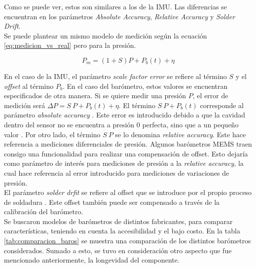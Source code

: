 Como se puede ver, estos son similares a los de la IMU. Las diferencias se encuentran en los parámetros \textit{Absolute Accuracy}, \textit{Relative Accuracy} y \textit{Solder Drift}.\\

Se puede plantear un mismo modelo de medición según la ecuación \ref{eq:medicion_vs_real} pero para la presión.

\begin{equation}
    P_m = (1+S)P + P_b(t) + \eta
    \label{eq:medicion_presion}
\end{equation}

En el caso de la IMU, el parámetro \textit{scale factor error} se refiere al término $S$ y el \textit{offset} al término $P_b$. En el caso del barómetro, estos valores se encuentran especificados de otra manera. Si se quiere medir una presión $P$, el error de medición será $\Delta P = S \ P + P_b(t) + \eta$. El término $S \ P + P_b(t)$ corresponde al parámetro \textit{absolute accuracy} \cite{baro_4}. Este error es introducido debido a que la cavidad dentro del sensor no se encuentra a presión 0 perfecta, sino que a un pequeño valor \cite{baro_1}. Por otro lado, el término $S \ P$ se lo denomina \textit{relative accuracy}. Este hace referencia a mediciones diferenciales de presión. Algunos barómetros MEMS traen consigo una funcionalidad para realizar una compensación de offset. Esto dejaría como parámetro de interés para mediciones de presión a la \textit{relative accuracy}, la cual hace referencia al error introducido para mediciones de variaciones de presión.\\

El parámetro \textit{solder drfit} se refiere al offset que se introduce por el propio proceso de soldadura \cite{baro_4}. Este offset también puede ser compensado a través de la calibración del barómetro.\\

Se buscaron modelos de barómetros de distintos fabricantes, para comparar características, teniendo en cuenta la accesibilidad y el bajo costo. En la tabla \ref{tab:comparacion_baros} se muestra una comparación de los distintos barómetros considerados. Sumado a esto, se tuvo en consideración otro aspecto que fue mencionado anteriormente, la longevidad del componente.

